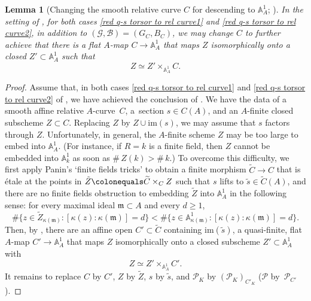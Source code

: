 \documentclass[JEP,XML,SOM,Unicode,published]{cedram}
\newcommand{\cP}{\mathcal{P}}
\newcommand{\sB}{\mathscr{B}}
\newcommand{\sG}{\mathscr{G}}
\let\wt\widetilde
\let\ce\colonequals
\newcommand{\bpf}{\begin{proof}}
\newcommand{\epf}{\end{proof}}
\newcommand{\blemt}{\begin{lemma-tweak}}
\newcommand{\elemt}{\end{lemma-tweak}}
\theoremstyle{plain}
\newtheorem{lemma-tweak}[subsection]{Lemma}
\theoremstyle{definition}
\begin{document}
\blemt [Changing the smooth relative curve $C$ for descending to $\mathbb{A}_A^1$; {\cite[Prop.\,6.5]{Ces22a}}]
\label{prepare for des. to A^1}
In the setting of , for both cases \eqref{red q-s torsor to rel curve1} and \eqref{red q-s torsor to rel curve2}, in addition to $(\sG,\sB)=(G_C,B_C)$,
we may change $C$ to further achieve that there is a flat $A$-map $C\to \mathbb{A}_A^1$ that maps $Z$ isomorphically onto a closed $Z'\subset \mathbb{A}_A^1$ such that
\[
Z\simeq Z' \times_{\mathbb{A}_A^1}C.
\]
\elemt
\bpf
Assume that, in both cases \eqref{red q-s torsor to rel curve1} and \eqref{red q-s torsor to rel curve2} of , we have achieved the conclusion of . We have the data of a smooth affine relative $A$\nobreakdash-curve~$C$, a~section $s\in C(A)$, and an $A$-finite closed subscheme $Z\subset C$.
Replacing $Z$ by $Z\cup \text{im}(s)$, we may assume that $s$ factors through $Z$. Unfortunately, in general, the $A$-finite scheme $Z$ may be too large to embed into $\mathbb{A}_A^1$.
(For instance, if $R=k$ is a finite field, then $Z$ cannot be embedded into $\mathbb{A}_k^1$ as soon as $\# \,Z(k) > \# \,k$.)
To overcome this difficulty, we first apply {Panin's `finite fields tricks' \cite[Lem.\,6.1]{Ces22a}} to obtain a finite morphism $\wt{C}\to C$ that is étale at the points in $\tilde{Z}\ce \wt{C}\times_CZ$ such that $s$ lifts to $\wt{s}\in \wt{C}(A)$, and there are no finite fields obstruction to embedding $\wt{Z}$ into $\mathbb{A}_A^1$ in the following sense: for every maximal ideal $\mathfrak{m}\subset A$ and every $d\geq 1$,
\[
\# \bigl\{
z\in \wt{Z}_{\kappa(\mathfrak{m})}\colon [\kappa(z)\colon \kappa(\mathfrak{m})]=d \bigr\}< \# \bigl\{z\in \mathbb{A}_{\kappa(\mathfrak{m})}^1\colon [\kappa(z)\colon\kappa(\mathfrak{m})]=d \bigr\}.
\]
Then, by \cite[Lem.\,6.3]{Ces22a}, there are an affine open $C'\subset \wt{C}$ containing $\text{im}(\wt{s}) $, a quasi-finite, flat $A$-map $C'\to \mathbb{A}_A^1$ that maps $Z$ isomorphically onto a closed subscheme $Z'\subset \mathbb{A}_A^1$ with
\[
Z\simeq Z' \times_{\mathbb{A}_A^1}C'.
\]
It remains to replace $C$ by $C'$, $Z$ by $\wt{Z}$, $s$ by $\wt{s}$, and $\cP_K$ by $(\cP_K)_{C'_K}$ (\resp $\cP$ by~$\cP_{C'}$).
\epf
\end{document}

